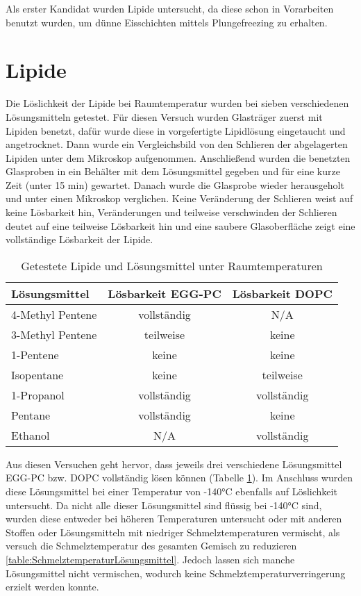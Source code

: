 Als erster Kandidat wurden Lipide untersucht, da diese schon in Vorarbeiten benutzt wurden, um dünne Eisschichten mittels Plungefreezing zu erhalten.

\section{Lipide}

Die Löslichkeit der Lipide bei Raumtemperatur wurden bei sieben verschiedenen Lösungsmitteln getestet. Für diesen Versuch wurden Glasträger zuerst mit Lipiden benetzt, dafür wurde diese in vorgefertigte Lipidlösung eingetaucht und angetrocknet. Dann wurde ein Vergleichsbild von den Schlieren der abgelagerten Lipiden unter dem Mikroskop aufgenommen. Anschließend wurden die benetzten Glasproben in ein Behälter mit dem Lösungsmittel gegeben und für eine kurze Zeit (unter 15 min) gewartet. Danach wurde die Glasprobe wieder herausgeholt und unter einen Mikroskop verglichen. Keine Veränderung der Schlieren weist auf keine Lösbarkeit hin, Veränderungen und teilweise verschwinden der Schlieren deutet auf eine teilweise Lösbarkeit hin und eine saubere Glasoberfläche zeigt eine vollständige Lösbarkeit der Lipide.

\begin{table}[h]
	\centering
	\begin{tabular}{|l|c|c|}
		\hline
		Lösungsmittel & Lösbarkeit EGG-PC & Lösbarkeit DOPC \\
		\hline
		\hline
		4-Methyl Pentene & vollständig & N/A  \\ 
		\hline
		3-Methyl Pentene & teilweise & keine \\
		\hline
		1-Pentene & keine & keine \\
		\hline
		Isopentane & keine & teilweise\\
		\hline
		1-Propanol & vollständig & vollständig\\
		\hline
		Pentane & vollständig & keine\\
		\hline
		Ethanol & N/A & vollständig\\
		\hline
	\end{tabular}
	\caption{Getestete Lipide und Lösungsmittel unter Raumtemperaturen}
	\label{table:LoeslichkeitRaumtemperatur}
\end{table}

Aus diesen Versuchen geht hervor, dass jeweils drei verschiedene Lösungsmittel EGG-PC bzw. DOPC vollständig lösen können (Tabelle \ref{table:LoeslichkeitRaumtemperatur}). Im Anschluss wurden diese Lösungsmittel bei einer Temperatur von -140°C ebenfalls auf Löslichkeit untersucht. Da nicht alle dieser Lösungsmittel sind flüssig bei -140°C sind, wurden diese entweder bei höheren Temperaturen untersucht oder mit anderen Stoffen oder Lösungsmitteln mit niedriger Schmelztemperaturen vermischt, als versuch die Schmelztemperatur des gesamten Gemisch zu reduzieren \ref{table:SchmelztemperaturLösungsmittel}. Jedoch lassen sich manche Lösungsmittel nicht vermischen, wodurch keine Schmelztemperaturverringerung erzielt werden konnte. 

